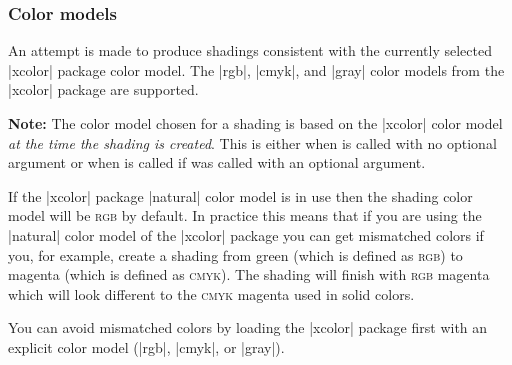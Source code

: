 \subsubsection{Color models}

An attempt is made to produce shadings consistent with the currently selected
|xcolor| package color model. The |rgb|, |cmyk|, and |gray| color models from
the |xcolor| package are supported.

\textbf{Note:} The color model chosen for a shading is based on the |xcolor|
color model \emph{at the time the shading is created}. This is either when
 is called with no optional argument or when
 is called if  was called with an
optional argument.

If the |xcolor| package |natural| color model is in use then the shading color
model will be \textsc{rgb} by default. In practice this means that if you are
using the |natural| color model of the |xcolor| package you can get mismatched
colors if you, for example, create a shading from green (which is defined as
\textsc{rgb}) to magenta (which is defined as \textsc{cmyk}). The shading will
finish with \textsc{rgb} magenta which will look different to the
\textsc{cmyk} magenta used in solid colors.

You can avoid mismatched colors by loading the |xcolor| package first with an
explicit color model (|rgb|, |cmyk|, or |gray|).

\begin{codeexample}
\end{codeexample}

